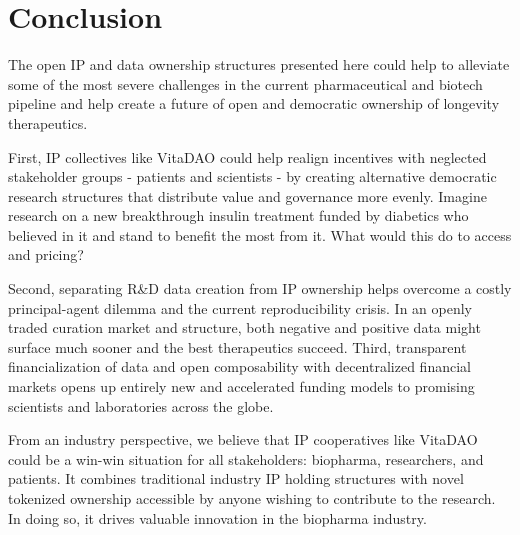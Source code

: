 \documentclass[12pt,letterpaper]{article}
\begin{document}
\section{Conclusion}
The open IP and data ownership structures presented here could help to alleviate some of the most severe challenges in the current pharmaceutical and biotech pipeline and help create a future of open and democratic ownership of longevity therapeutics. 

First, IP collectives like VitaDAO could help realign incentives with neglected stakeholder groups - patients and scientists - by creating alternative democratic research structures that distribute value and governance more evenly. Imagine research on a new breakthrough insulin treatment funded by diabetics who believed in it and stand to benefit the most from it. What would this do to access and pricing?

Second, separating R\&D data creation from IP ownership helps overcome a costly principal-agent dilemma and the current reproducibility crisis. In an openly traded curation market and structure, both negative and positive data might surface much sooner and the best therapeutics succeed. Third, transparent financialization of data  and open composability with decentralized financial markets opens up entirely new and accelerated funding models to promising scientists and laboratories across the globe. 

From an industry perspective, we believe that IP cooperatives like VitaDAO could be a win-win situation for all stakeholders: biopharma, researchers, and patients. It combines traditional industry IP holding structures with novel tokenized ownership accessible by anyone wishing to contribute to the research. In doing so, it drives valuable innovation in the biopharma industry.

\clearpage


\raggedright 


 
\end{document}
